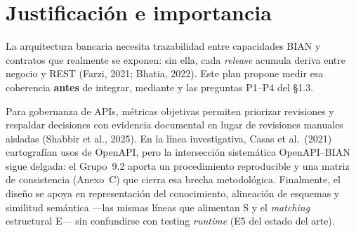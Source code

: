 \section{Justificación e importancia}

La arquitectura bancaria necesita trazabilidad entre capacidades BIAN y contratos que realmente se
exponen: sin ella, cada \textit{release} acumula deriva entre negocio y REST (Farzi, 2021; Bhatia,
2022). Este plan propone medir esa coherencia \textbf{antes} de integrar, mediante
\AlignmentScore{} y las preguntas P1--P4 del §1.3.

Para gobernanza de APIs, métricas objetivas permiten priorizar revisiones y respaldar decisiones con
evidencia documental en lugar de revisiones manuales aisladas (Shabbir et al., 2025). En la línea
investigativa, Casas et al.\ (2021) cartografían usos de OpenAPI, pero la intersección sistemática
OpenAPI--BIAN sigue delgada: el Grupo~9.2 aporta un procedimiento reproducible y una matriz de
consistencia (Anexo~C) que cierra esa brecha metodológica. Finalmente, el diseño se apoya en
representación del conocimiento, alineación de esquemas y similitud semántica ---las mismas líneas
que alimentan S y el \textit{matching} estructural E--- sin confundirse con testing \textit{runtime}
(E5 del estado del arte).
